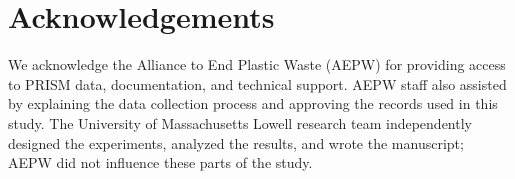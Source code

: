 \section*{Acknowledgements}

We acknowledge the Alliance to End Plastic Waste (AEPW) for providing access to PRISM data, documentation, and technical support. AEPW staff also assisted by explaining the data collection process and approving the records used in this study. The University of Massachusetts Lowell research team independently designed the experiments, analyzed the results, and wrote the manuscript; AEPW did not influence these parts of the study.
